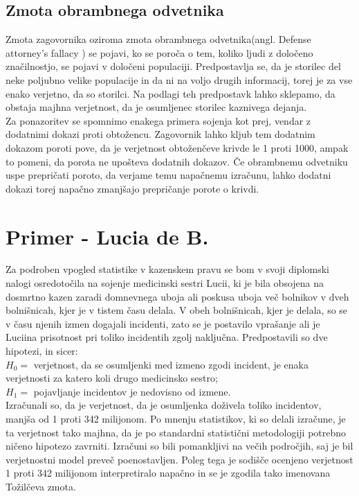 \documentclass[12pt,a4paper]{amsart}
\theoremstyle{definition} %
\theoremstyle{plain} %
\begin{document}
\subsection{Zmota obrambnega odvetnika}
Zmota zagovornika oziroma zmota obrambnega odvetnika(angl. Defense attorney's fallacy ) se pojavi, ko se poroča o tem, koliko ljudi z 
določeno značilnostjo, se pojavi v določeni populaciji. Predpostavlja se, da je storilec del neke poljubno velike populacije in da ni na voljo 
drugih informacij, torej je za vse enako verjetno, da so storilci. Na podlagi teh predpostavk lahko sklepamo, da obstaja majhna verjetnost, 
da je osumljenec storilec kaznivega dejanja. \\

Za ponazoritev se spomnimo enakega primera sojenja kot prej, vendar z dodatnimi dokazi proti obtožencu. Zagovornik lahko kljub tem dodatnim 
dokazom poroti pove, da je verjetnost obtoženčeve krivde le 1 proti 1000, ampak to pomeni, da porota ne upošteva dodatnih dokazov. Če obrambnemu 
odvetniku uspe prepričati poroto, da verjame temu napačnemu izračunu, lahko dodatni dokazi torej napačno zmanjšajo prepričanje porote o krivdi. \vspace{3mm}

\section{Primer - Lucia de B.}
Za podroben vpogled statistike v kazenskem pravu se bom v svoji diplomski nalogi osredotočila na sojenje medicinski sestri Lucii, ki je bila
obsojena na dosmrtno kazen zaradi domnevnega uboja ali poskusa uboja več bolnikov v dveh bolnišnicah, kjer je v tistem času delala. V obeh
bolnišnicah, kjer je delala, so se v času njenih izmen dogajali incidenti, zato se je postavilo vprašanje ali je Luciina prisotnost pri
toliko incidentih zgolj naključna. Predpostavili so dve hipotezi, in sicer: \\
$H_0 =$ verjetnost, da se osumljenki med izmeno zgodi incident, je enaka verjetnosti za katero koli drugo medicinsko sestro; \\
$H_1=$ pojavljanje incidentov je nedovisno od izmene.\\
 
Izračunali so, da je verjetnost, da je osumljenka doživela toliko incidentov, manjša od 1 proti 342 milijonom. Po mnenju statistikov, ki so
delali izračune, je ta verjetnost tako majhna, da je po standardni statistični metodologiji potrebno ničeno hipotezo zavrniti. Izračuni so bili
pomankljivi na večih področjih, saj je bil verjetnostni model preveč poenostavljen. Poleg tega je sodišče ocenjeno verjetnost 1 proti 342 milijonom
interpretiralo napačno in se je zgodila tako imenovana Tožilčeva zmota.
\end{document}
